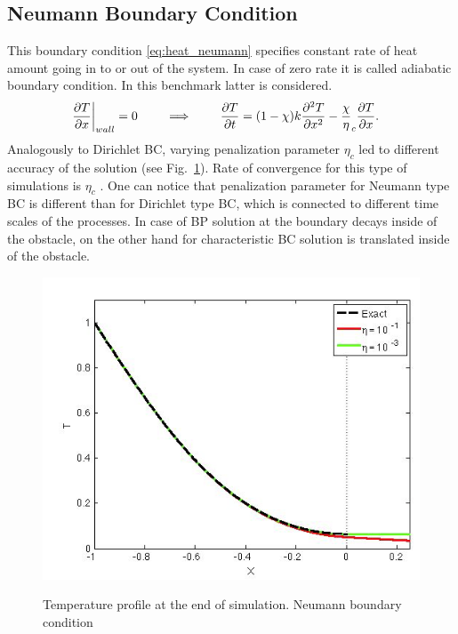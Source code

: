 \subsection{Neumann Boundary Condition}
This boundary condition \eqref{eq:heat_neumann} specifies constant rate of heat amount going in to or out of the system. In case of zero rate it is called adiabatic boundary condition. In this benchmark latter is considered.
\begin{align}
\left.\frac {\partial T}{\partial x}\right|_{wall} = 0 \qquad \implies \qquad \frac {\partial T}{\partial t} &= (1-\chi)k \frac {\partial^2 T}{\partial x^2} - \frac \chi \eta_c \frac {\partial T}{\partial x}. \label{eq:heat_neumann}
\end{align}
Analogously to Dirichlet BC, varying penalization parameter $\eta_c$ led to different accuracy of the solution (see Fig.~\ref{fig:heat_neumann}). Rate of convergence for this type of simulations is $\eta_c$ \cite{ebd_nk_ovv_cbvp_jcp}. One can notice that penalization parameter for Neumann type BC is different than for Dirichlet type BC, which is connected to different time scales of the processes. In case of BP solution at the boundary decays inside of the obstacle, on the other hand for characteristic BC solution is translated inside of the obstacle. 
\begin{figure}[h!]
\centering \includegraphics[scale=0.6]{fig/heat_neumann.png}\\
\caption{Temperature profile at the end of simulation. Neumann boundary condition \label{fig:heat_neumann}}
\end{figure}

